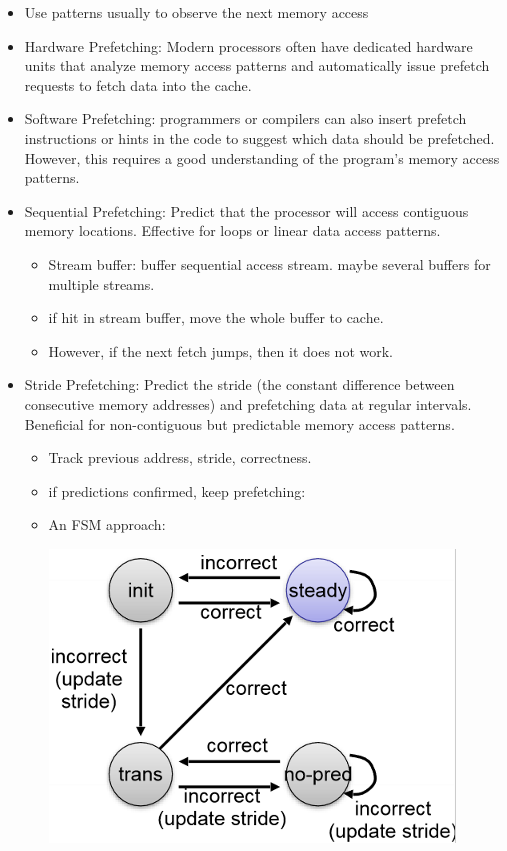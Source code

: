 \documentclass[letterpaper,12pt]{article}
\begin{document}
\begin{itemize}
    \item Use patterns usually to observe the next memory access
    \item Hardware Prefetching: Modern processors often have dedicated hardware units that analyze memory access patterns and automatically issue prefetch requests to fetch data into the cache.
    \item Software Prefetching: programmers or compilers can also insert prefetch instructions or hints in the code to suggest which data should be prefetched. However, this requires a good understanding of the program's memory access patterns.
    \item Sequential Prefetching: Predict that the processor will access contiguous memory locations. Effective for loops or linear data access patterns.
          \begin{itemize}
              \item Stream buffer: buffer sequential access stream. maybe several buffers for multiple streams.
              \item if hit in stream buffer, move the whole buffer to cache.
              \item However, if the next fetch jumps, then it does not work.
          \end{itemize}
    \item Stride Prefetching: Predict the stride (the constant difference between consecutive memory addresses) and prefetching data at regular intervals. Beneficial for non-contiguous but predictable memory access patterns.
          \begin{itemize}
              \item Track previous address, stride, correctness.
              \item if predictions confirmed, keep prefetching:
              \item An FSM approach:

                    \includegraphics*{./Image/Stride FSM.png}


\end{itemize}
\end{itemize}
\end{document}
